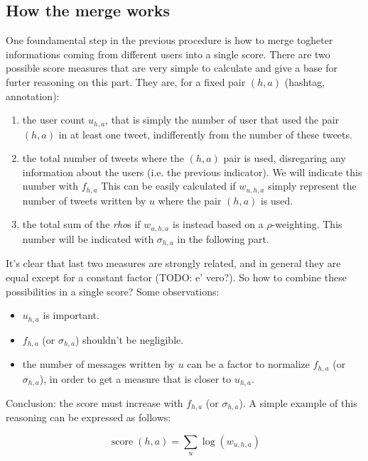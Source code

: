 \documentclass[a4paper,11pt,oneside]{article}
\DeclareMathOperator{\score}{score}
\begin{document}
\subsection{How the merge works}
\label{sec:merge}
One foundamental step in the previous procedure is how to merge togheter informations coming from different users into a single score. There are two possible score measures that are very simple to calculate and give a base for furter reasoning on this part. They are, for a fixed pair $(h, a)$ (hashtag, annotation):
\begin{enumerate}
\item the user count $u_{h,a}$, that is simply the number of user that used the pair $(h,a)$ in at least one tweet, indifferently from the number of these tweets.
\item the total number of tweets where the $(h,a)$ pair is used, disregaring any information about the users (i.e. the previous indicator). We will indicate this number with $f_{h,a}$ This can be easily calculated if $w_{u,h,a}$ simply represent the number of tweets written by $u$ where the pair $(h,a)$ is used.
\item the total sum of the \textit{rho}s if $w_{u,h,a}$ is instead based on a $\rho$-weighting. This number will be indicated with $\sigma_{h,a}$ in the following part.
\end{enumerate}

It's clear that last two measures are strongly related, and in general they are equal except for a constant factor (TODO: e' vero?). So how to combine these possibilities in a single score?
Some observations:

\begin{itemize}
\item $u_{h,a}$ is important.
\item $f_{h,a}$ (or $\sigma_{h,a}$) shouldn't be negligible.
\item the number of messages written by $u$ can be a factor to normalize $f_{h,a}$ (or $\sigma_{h,a}$), in order to get a measure that is closer to $u_{h,a}$.
\end{itemize}

Conclusion: the score must increase with $f_{h,a}$ (or $\sigma_{h,a}$). A simple example of this reasoning can be expressed as follows:

\begin{equation}
\score (h,a) = \sum_{u} \log \left(  w_{u,h,a} \right) 
\end{equation}
\end{document}
